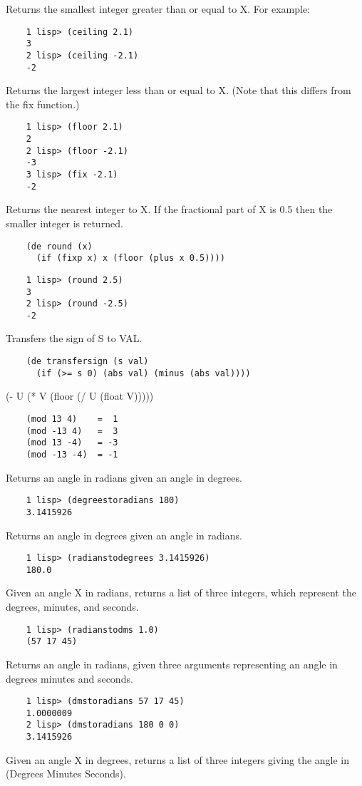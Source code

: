 {    Returns  the  smallest  integer  greater than or equal to X.
    For example: }
\begin{verbatim}
    1 lisp> (ceiling 2.1)
    3
    2 lisp> (ceiling -2.1)
    -2
\end{verbatim}
{    Returns the largest integer less than or equal to X.   (Note
    that this differs from the fix function.)
}
\begin{verbatim}
    1 lisp> (floor 2.1)
    2
    2 lisp> (floor -2.1)
    -3
    3 lisp> (fix -2.1)
    -2
\end{verbatim}
{    Returns the nearest integer to X.  If the fractional part of
    X is 0.5 then the smaller integer is returned.
}
\begin{verbatim}
    (de round (x)
      (if (fixp x) x (floor (plus x 0.5))))
\end{verbatim}
\begin{verbatim}
    1 lisp> (round 2.5)
    3
    2 lisp> (round -2.5)
    -2
\end{verbatim}
{    Transfers the sign of S to VAL.
}
\begin{verbatim}
    (de transfersign (s val)
      (if (>= s 0) (abs val) (minus (abs val))))
\end{verbatim}
{    (- U (* V (floor (/ U (float V)))))
}
\begin{verbatim}
    (mod 13 4)    =  1
    (mod -13 4)   =  3
    (mod 13 -4)   = -3
    (mod -13 -4)  = -1
\end{verbatim}
{    Returns an angle in radians given an angle in degrees.
}
\begin{verbatim}
    1 lisp> (degreestoradians 180)
    3.1415926
\end{verbatim}
{    Returns an angle in degrees given an angle in radians.
}
\begin{verbatim}
    1 lisp> (radianstodegrees 3.1415926)
    180.0
\end{verbatim}
{    Given  an  angle  X  in  radians,  returns  a  list of three
    integers, which represent the degrees, minutes, and seconds.  }
\begin{verbatim}
    1 lisp> (radianstodms 1.0)
    (57 17 45)
\end{verbatim}
{    Returns  an  angle  in  radians,   given   three   arguments
    representing an angle in degrees minutes and seconds.  }
\begin{verbatim}
    1 lisp> (dmstoradians 57 17 45)
    1.0000009
    2 lisp> (dmstoradians 180 0 0)
    3.1415926
\end{verbatim}
{    Given  an  angle  X  in  degrees,  returns  a  list of three
    integers giving the angle in (Degrees  Minutes  Seconds).  }

